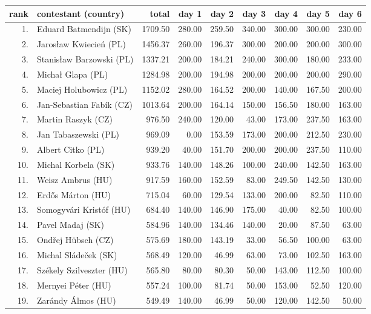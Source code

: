 \begin{tabular}{rl|r|rrrrrr}
rank & contestant (country) & total & day 1 & day 2 & day 3 & day 4 & day 5 & day 6 \\
\hline
 1. & Eduard Batmendijn (SK) & 1709.50 & 280.00 & 259.50 & 340.00 & 300.00 & 300.00 & 230.00 \\
 2. & Jarosław Kwiecień (PL) & 1456.37 & 260.00 & 196.37 & 300.00 & 200.00 & 200.00 & 300.00 \\
 3. & Stanisław Barzowski (PL) & 1337.21 & 200.00 & 184.21 & 240.00 & 300.00 & 180.00 & 233.00 \\
 4. & Michał Glapa (PL) & 1284.98 & 200.00 & 194.98 & 200.00 & 200.00 & 200.00 & 290.00 \\
 5. & Maciej Holubowicz (PL) & 1152.02 & 280.00 & 164.52 & 200.00 & 140.00 & 167.50 & 200.00 \\
 6. & Jan-Sebastian Fabík (CZ) & 1013.64 & 200.00 & 164.14 & 150.00 & 156.50 & 180.00 & 163.00 \\
 7. & Martin Raszyk (CZ) & 976.50 & 240.00 & 120.00 & 43.00 & 173.00 & 237.50 & 163.00 \\
 8. & Jan Tabaszewski (PL) & 969.09 & 0.00 & 153.59 & 173.00 & 200.00 & 212.50 & 230.00 \\
 9. & Albert Citko (PL) & 939.20 & 40.00 & 151.70 & 200.00 & 200.00 & 237.50 & 110.00 \\
10. & Michal Korbela (SK) & 933.76 & 140.00 & 148.26 & 100.00 & 240.00 & 142.50 & 163.00 \\
11. & Weisz Ambrus (HU) & 917.59 & 160.00 & 152.59 & 83.00 & 249.50 & 142.50 & 130.00 \\
12. & Erdős Márton (HU) & 715.04 & 60.00 & 129.54 & 133.00 & 200.00 & 82.50 & 110.00 \\
13. & Somogyvári Kristóf (HU) & 684.40 & 140.00 & 146.90 & 175.00 & 40.00 & 82.50 & 100.00 \\
14. & Pavel Madaj (SK) & 584.96 & 140.00 & 134.46 & 140.00 & 20.00 & 87.50 & 63.00 \\
15. & Ondřej Hübsch (CZ) & 575.69 & 180.00 & 143.19 & 33.00 & 56.50 & 100.00 & 63.00 \\
16. & Michal Sládeček (SK) & 568.49 & 120.00 & 46.99 & 63.00 & 73.00 & 102.50 & 163.00 \\
17. & Székely Szilveszter (HU) & 565.80 & 80.00 & 80.30 & 50.00 & 143.00 & 112.50 & 100.00 \\
18. & Mernyei Péter (HU) & 557.24 & 100.00 & 81.74 & 50.00 & 153.00 & 52.50 & 120.00 \\
19. & Zarándy Álmos (HU) & 549.49 & 140.00 & 46.99 & 50.00 & 120.00 & 142.50 & 50.00 \\

\end{tabular}
